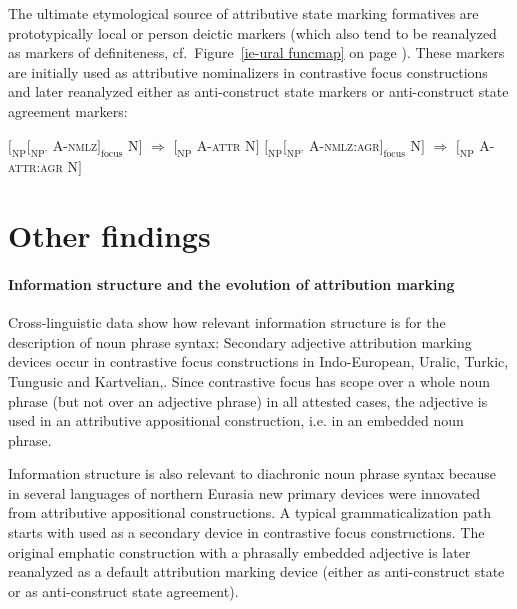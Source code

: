 The ultimate etymological source of attributive state marking formatives are prototypically local or person deictic markers (which also tend to be reanalyzed as markers of definiteness, cf.~Figure~\ref{ie-ural funcmap} on page \pageref{ie-ural funcmap}). These markers are initially used as attributive nominalizers in contrastive focus constructions and later reanalyzed either as anti\hyp{}construct state markers or anti\hyp{}construct state agreement markers:
\begin{exe}
\ex
\begin{xlist}
\ex \rm{$[_{\text{NP}} [_{\text{NP'}}$ A-\textsc{nmlz}$]_{\text{focus}}$ N$]$ $\Rightarrow$ $[_{\text{NP}}$ A-\textsc{attr} N$]$}
\ex \rm{$[_{\text{NP}} [_{\text{NP'}}$ A-\textsc{nmlz:agr}$]_{\text{focus}}$ N$]$ $\Rightarrow$ $[_{\text{NP}}$ A-\textsc{attr:agr} N$]$}
\end{xlist}
\end{exe}

\section{Other findings}
\paragraph*{Information structure and the evolution of attribution marking} Cross\hyp{}linguistic data show how relevant information structure is for the description of noun phrase syntax: Secondary adjective attribution marking devices occur in contrastive focus constructions in Indo-European, Uralic, Turkic, Tungusic and Kartvelian,. Since contrastive focus has scope over a whole noun phrase (but not over an adjective phrase) in all attested cases, the adjective is used in an attributive appositional construction, i.e. in an embedded noun phrase.

Information structure is also relevant to diachronic noun phrase syntax because in several languages of northern Eurasia new primary devices were innovated from attributive appositional constructions. A typical grammaticalization path starts with  used as a secondary device in contrastive focus constructions. The original emphatic construction with a phrasally embedded adjective is later reanalyzed as a default attribution marking device (either as anti\hyp{}construct state or as anti\hyp{}construct state agreement).

